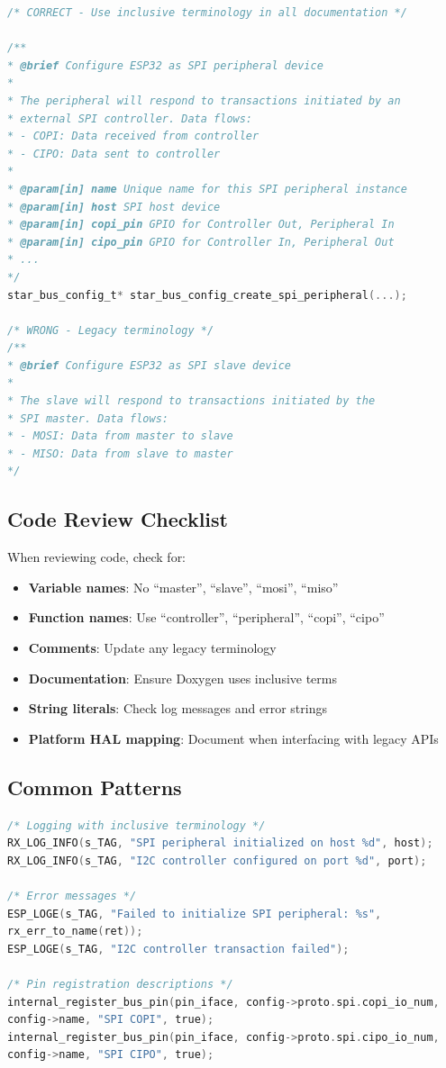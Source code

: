 \begin{lstlisting}[language=C]
/* CORRECT - Use inclusive terminology in all documentation */

/**
* @brief Configure ESP32 as SPI peripheral device
*
* The peripheral will respond to transactions initiated by an
* external SPI controller. Data flows:
* - COPI: Data received from controller
* - CIPO: Data sent to controller
*
* @param[in] name Unique name for this SPI peripheral instance
* @param[in] host SPI host device
* @param[in] copi_pin GPIO for Controller Out, Peripheral In
* @param[in] cipo_pin GPIO for Controller In, Peripheral Out
* ...
*/
star_bus_config_t* star_bus_config_create_spi_peripheral(...);

/* WRONG - Legacy terminology */
/**
* @brief Configure ESP32 as SPI slave device
*
* The slave will respond to transactions initiated by the
* SPI master. Data flows:
* - MOSI: Data from master to slave
* - MISO: Data from slave to master
*/
\end{lstlisting}

\subsection{Code Review Checklist}

When reviewing code, check for:

\begin{itemize}
    \item \textbf{Variable names}: No ``master'', ``slave'', ``mosi'', ``miso''
    \item \textbf{Function names}: Use ``controller'', ``peripheral'', ``copi'', ``cipo''
    \item \textbf{Comments}: Update any legacy terminology
    \item \textbf{Documentation}: Ensure Doxygen uses inclusive terms
    \item \textbf{String literals}: Check log messages and error strings
    \item \textbf{Platform HAL mapping}: Document when interfacing with legacy APIs
\end{itemize}

\subsection{Common Patterns}

\begin{lstlisting}[language=C]
/* Logging with inclusive terminology */
RX_LOG_INFO(s_TAG, "SPI peripheral initialized on host %d", host);
RX_LOG_INFO(s_TAG, "I2C controller configured on port %d", port);

/* Error messages */
ESP_LOGE(s_TAG, "Failed to initialize SPI peripheral: %s",
rx_err_to_name(ret));
ESP_LOGE(s_TAG, "I2C controller transaction failed");

/* Pin registration descriptions */
internal_register_bus_pin(pin_iface, config->proto.spi.copi_io_num,
config->name, "SPI COPI", true);
internal_register_bus_pin(pin_iface, config->proto.spi.cipo_io_num,
config->name, "SPI CIPO", true);
\end{lstlisting}

